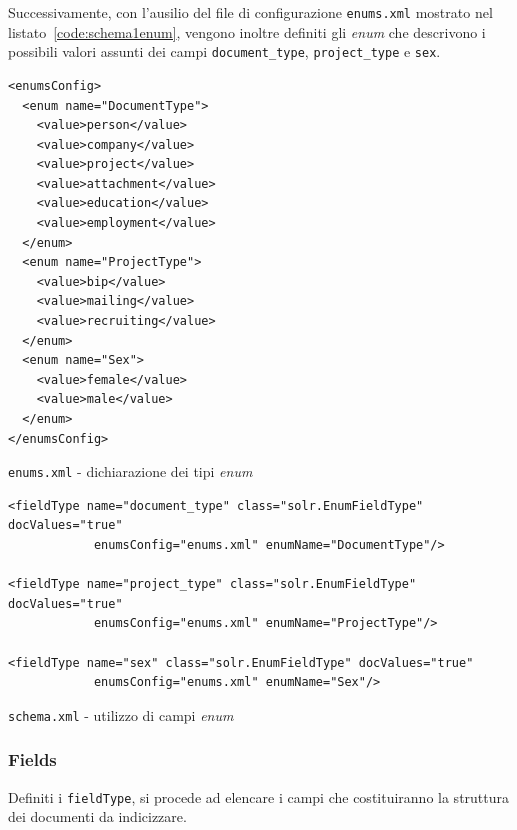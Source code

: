\vspace{2em}
Successivamente, con l’ausilio del file di configurazione \texttt{enums.xml} mostrato nel listato~\ref{code:schema1enum}, vengono inoltre definiti gli \textit{enum} che descrivono i possibili valori assunti dei campi \texttt{document\_type}, \texttt{project\_type} e \texttt{sex}.

\vspace{0.5em}
\begin{listing}[H]
\begin{verbatim}
<enumsConfig>
  <enum name="DocumentType">
    <value>person</value>
    <value>company</value>
    <value>project</value>
    <value>attachment</value>
    <value>education</value>
    <value>employment</value>
  </enum>
  <enum name="ProjectType">
    <value>bip</value>
    <value>mailing</value>
    <value>recruiting</value>
  </enum>
  <enum name="Sex">
    <value>female</value>
    <value>male</value>
  </enum>
</enumsConfig>
\end{verbatim}
\caption{\texttt{enums.xml} - dichiarazione dei tipi \textit{enum}}
\label{code:schema1enum}
\end{listing}

\vspace{-1em}
\begin{listing}[H]
\begin{verbatim}
<fieldType name="document_type" class="solr.EnumFieldType" docValues="true"
            enumsConfig="enums.xml" enumName="DocumentType"/>
            
<fieldType name="project_type" class="solr.EnumFieldType" docValues="true" 
            enumsConfig="enums.xml" enumName="ProjectType"/>
            
<fieldType name="sex" class="solr.EnumFieldType" docValues="true" 
            enumsConfig="enums.xml" enumName="Sex"/>
\end{verbatim}
\caption{\texttt{schema.xml} - utilizzo di campi \textit{enum}}
\label{code:schema1enumuse}
\end{listing}

\subsubsection{Fields}

Definiti i \texttt{fieldType}, si procede ad elencare i campi che costituiranno la struttura dei documenti da indicizzare.

